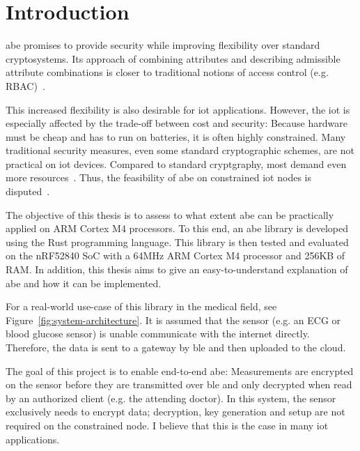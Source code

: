 
\chapter{Introduction}\label{chapter:introduction}

\acrfull{abe} promises to provide security while improving flexibility over standard cryptosystems.
Its approach of combining \glspl{attribute} and  describing admissible attribute combinations is closer to traditional notions of access control (e.g. RBAC)~\cite{bethencourt_ciphertext-policy_2007}.

This increased flexibility is also desirable for \acrshort{iot} applications.
However, the \acrfull{iot} is especially affected by the trade-off between cost and security:
Because hardware must be cheap and has to run on batteries, it is often highly constrained.
Many traditional security measures, even some standard cryptographic schemes, are not practical on \acrshort{iot} devices.
Compared to standard cryptgraphy, most  demand even more resources~\cite{wang_performance_2014}.
Thus, the feasibility of \acrshort{abe} on constrained \acrshort{iot} nodes is disputed~\cite{wang_performance_2014,ambrosin_feasibility_2016,ambrosin_feasibility_2015,girgenti_feasibility_2019,borgh_attribute-based_2016}.

The objective of this thesis is to assess to what extent \acrshort{abe} can be practically applied on ARM Cortex M4 processors.
To this end, an \acrshort{abe} library is developed using the Rust programming language.
This library is then tested and evaluated on the nRF52840 SoC with a 64MHz ARM Cortex M4 processor and 256KB of RAM.
In addition, this thesis aims to give an easy-to-understand explanation of \acrshort{abe} and how it can be implemented.



For a real-world use-case of this library in the medical field, see Figure~\ref{fig:system-architecture}.
It is assumed that the sensor (e.g. an ECG or blood glucose sensor) is unable communicate with the internet directly.
Therefore, the data is sent to a gateway by \acrfull{ble} and then uploaded to the cloud.

The goal of this project is to enable end-to-end \acrlong{abe}:
Measurements are encrypted on the sensor before they are transmitted over \acrshort{ble} and only decrypted when read by an authorized client (e.g. the attending doctor).
In this system, the sensor exclusively needs to encrypt data; decryption, key generation and setup are not required on the constrained node.
I believe that this is the case in many \acrshort{iot} applications.

